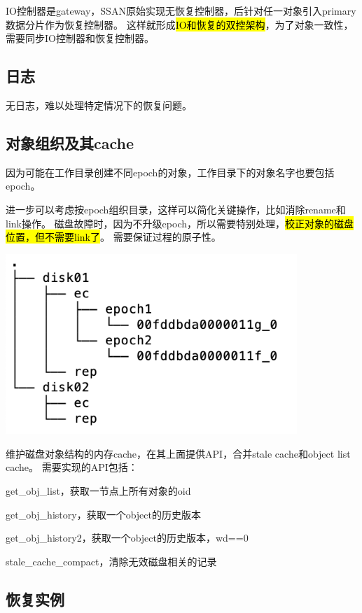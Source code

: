 IO控制器是gateway，SSAN原始实现无恢复控制器，后针对任一对象引入primary数据分片作为恢复控制器。
这样就形成\hl{IO和恢复的双控架构}，为了对象一致性，需要同步IO控制器和恢复控制器。

\subsection{日志}

无日志，难以处理特定情况下的恢复问题。

\subsection{对象组织及其cache}
\label{subsec:object-dir}

因为可能在工作目录创建不同epoch的对象，工作目录下的对象名字也要包括epoch。

进一步可以考虑按epoch组织目录，这样可以简化关键操作，比如消除rename和link操作。
磁盘故障时，因为不升级epoch，所以需要特别处理，\hl{校正对象的磁盘位置，但不需要link了}。
需要保证过程的原子性。

\includegraphics[width=11cm]{../imgs/object-dir.png}

维护磁盘对象结构的内存cache，在其上面提供API，合并stale cache和object list cache。
需要实现的API包括：
\begin{enumbox}
\item get\_obj\_list，获取一节点上所有对象的oid
\item get\_obj\_history，获取一个object的历史版本
\item get\_obj\_history2，获取一个object的历史版本，wd==0
\item stale\_cache\_compact，清除无效磁盘相关的记录
\end{enumbox}

\subsection{恢复实例}

